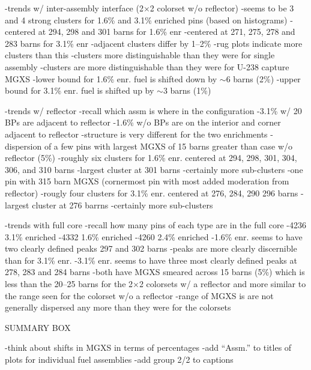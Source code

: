 -trends w/ inter-assembly interface (2$\times$2 colorset w/o reflector)
  -seems to be 3 and 4 strong clusters for 1.6\% and 3.1\% enriched pins (based on histograms)
    -centered at 294, 298 and 301 barns for 1.6\% enr
    -centered at 271, 275, 278 and 283 barns for 3.1\% enr
    -adjacent clusters differ by 1--2\%
  -rug plots indicate more clusters than this
  -clusters more distinguishable than they were for single assembly  
  -clusters are more distinguishable than they were for U-238 capture \ac{MGXS}
  -lower bound for 1.6\% enr. fuel is shifted down by $\sim$6 barns (2\%)
  -upper bound for 3.1\% enr. fuel is shifted up by $\sim$3 barns (1\%)

-trends w/ reflector
  -recall which assm is where in the configuration
    -3.1\% w/ 20 \acp{BP} are adjacent to reflector
    -1.6\% w/o \acp{BP} are on the interior and corner adjacent to reflector
  -structure is very different for the two enrichments
    -dispersion of a few pins with largest \ac{MGXS} of 15 barns greater than case w/o reflector (5\%)
  -roughly six clusters for 1.6\% enr. centered at 294, 298, 301, 304, 306, and 310 barns
    -largest cluster at 301 barns
    -certainly more sub-clusters
    -one pin with 315 barn \ac{MGXS} (cornermost pin with most added moderation from reflector)
  -rougly four clusters for 3.1\% enr. centered at 276, 284, 290 296 barns
    -largest cluster at 276 barrns
    -certainly more sub-clusters
  
-trends with full core
  -recall how many pins of each type are in the full core
    -4236 3.1\% enriched
    -4332 1.6\% enriched
    -4260 2.4\% enriched
  -1.6\% enr. seems to have two clearly defined peaks 297 and 302 barns
    -peaks are more clearly discernible than for 3.1\% enr.
  -3.1\% enr. seems to have three most clearly defined peaks at 278, 283 and 284 barns
  -both have \ac{MGXS} smeared across 15 barns (5\%) which is less than the 20--25 barns for the 2$\times$2 colorsets w/ a reflector and more similar to the range seen for the colorset w/o a reflector
  -range of \ac{MGXS} is are not generally dispersed any more than they were for the colorsets 

SUMMARY BOX

-think about shifts in \ac{MGXS} in terms of percentages
-add ``Assm.'' to titles of plots for individual fuel assemblies
-add group 2/2 to captions

